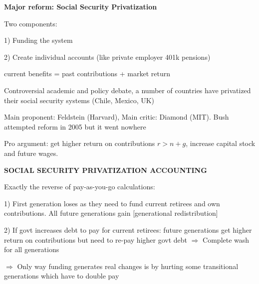 \documentclass[landscape]{slides}
\begin{document}
\begin{slide}
\begin{center}
{\bf Major reform: Social Security Privatization}
\end{center}

Two components:

1) Funding the system

2) Create individual accounts (like private employer 401k pensions)

current benefits = past contributions + market return

Controversial academic and policy debate, a number of countries have privatized
their social security systems (Chile, Mexico, UK)

Main proponent: Feldstein (Harvard), Main critic: Diamond (MIT). Bush attempted reform in 2005
but it went nowhere

Pro argument: get higher return on contributions $r>n+g$, increase capital stock and future wages.

\end{slide}

\begin{slide}
\begin{center}
{\bf SOCIAL SECURITY PRIVATIZATION ACCOUNTING}
\end{center}
Exactly the reverse of pay-as-you-go calculations:

1) First generation loses as they need to fund current retirees
and own contributions. All future generations gain
[generational redistribution]

2) If govt increases debt to pay for current retirees: future
generations get higher return on contributions but need to re-pay
higher govt debt $\Rightarrow$ Complete wash for all generations


$\Rightarrow$ Only way funding generates real changes is by
hurting some transitional generations which have to double pay

\end{slide}
\end{document}
